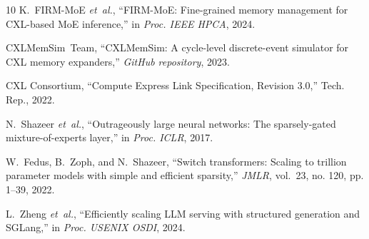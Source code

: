 \documentclass[10pt,journal,compsoc]{IEEEtran}
\begin{document}
\begin{thebibliography}{10}
K.~FIRM-MoE \emph{et~al.}, ``FIRM-MoE: Fine-grained memory management for CXL-based MoE inference,'' in \emph{Proc. IEEE HPCA}, 2024.

CXLMemSim~Team, ``CXLMemSim: A cycle-level discrete-event simulator for CXL memory expanders,'' \emph{GitHub repository}, 2023.

{CXL Consortium}, ``Compute Express Link Specification, Revision 3.0,'' Tech. Rep., 2022.

N.~Shazeer \emph{et~al.}, ``Outrageously large neural networks: The sparsely-gated mixture-of-experts layer,'' in \emph{Proc. ICLR}, 2017.

W.~Fedus, B.~Zoph, and N.~Shazeer, ``Switch transformers: Scaling to trillion parameter models with simple and efficient sparsity,'' \emph{JMLR}, vol.~23, no. 120, pp. 1--39, 2022.

L.~Zheng \emph{et~al.}, ``Efficiently scaling LLM serving with structured generation and SGLang,'' in \emph{Proc. USENIX OSDI}, 2024.

\end{thebibliography}
\end{document}
